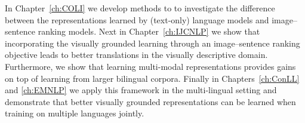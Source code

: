 In Chapter~\ref{ch:COLI} we develop methods to 
to investigate the difference between the representations learned by (text-only) language
models and image--sentence ranking models.
Next in Chapter~\ref{ch:IJCNLP} we show that incorporating
the visually grounded learning through an image--sentence ranking objective 
leads to better translations in the visually descriptive domain. Furthermore, 
we show that learning multi-modal representations provides gains on top of learning 
from larger bilingual corpora.
Finally in Chapters~\ref{ch:ConLL} and \ref{ch:EMNLP} we apply this 
framework in the multi-lingual setting and demonstrate
that better visually grounded representations can be learned when training on multiple
languages jointly. 









